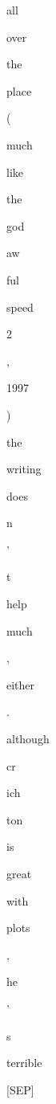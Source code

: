 \documentclass[varwidth=150mm]{standalone}
\begin{document}
\begin{CJK*}{UTF8}{gbsn}
{{{\colorbox{red!0.0}{\strut all} \colorbox{red!0.0}{\strut over} \colorbox{red!1.6070369482040405}{\strut the} \colorbox{red!4.48917818069458}{\strut place} \colorbox{red!2.072340726852417}{\strut (} \colorbox{red!5.551033973693848}{\strut much} \colorbox{red!2.5295157432556152}{\strut like} \colorbox{red!2.444472312927246}{\strut the} \colorbox{red!6.261335849761963}{\strut god}\colorbox{red!3.1753718852996826}{\strut aw}\colorbox{red!10.482402801513672}{\strut ful} \colorbox{red!55.9458122253418}{\strut speed} \colorbox{red!26.900745391845703}{\strut 2} \colorbox{red!12.626479148864746}{\strut ,} \colorbox{red!1.0266857147216797}{\strut 1997} \colorbox{red!11.207626342773438}{\strut )} \colorbox{red!18.680618286132812}{\strut the} \colorbox{red!7.670703887939453}{\strut writing} \colorbox{red!13.154651641845703}{\strut does} \colorbox{red!100.0}{\strut n} \colorbox{red!0.0}{\strut '} \colorbox{red!3.847299098968506}{\strut t} \colorbox{red!6.455639839172363}{\strut help} \colorbox{red!6.278794288635254}{\strut much} \colorbox{red!0.0}{\strut ,} \colorbox{red!1.9430923461914062}{\strut either} \colorbox{red!0.0}{\strut .} \colorbox{red!3.483793020248413}{\strut although} \colorbox{red!3.9077792167663574}{\strut cr}\colorbox{red!1.7841495275497437}{\strut ich}\colorbox{red!2.4037272930145264}{\strut ton} \colorbox{red!5.860628128051758}{\strut is} \colorbox{red!1.6615556478500366}{\strut great} \colorbox{red!2.9133799076080322}{\strut with} \colorbox{red!5.3049397468566895}{\strut plots} \colorbox{red!1.1163051128387451}{\strut ,} \colorbox{red!15.931309700012207}{\strut he} \colorbox{red!1.2964671850204468}{\strut '} \colorbox{red!13.409812927246094}{\strut s} \colorbox{red!45.50698471069336}{\strut terrible} \colorbox{red!1.3071037530899048}{\strut [SEP]}
}}}
\end{CJK*}
\end{document}
